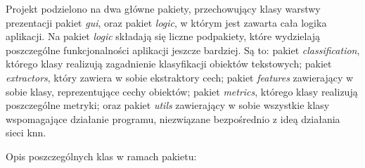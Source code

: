 \documentclass{classrep}
\begin{document}
Projekt podzielono na dwa główne pakiety, przechowujący klasy warstwy prezentacji pakiet \textit{gui}, oraz pakiet \textit{logic}, w którym jest zawarta cała logika aplikacji. Na pakiet \textit{logic} składają się liczne podpakiety, które wydzielają poszczególne funkcjonalności aplikacji jeszcze bardziej. Są to: pakiet \textit{classification}, którego klasy realizują zagadnienie klasyfikacji obiektów tekstowych; pakiet \textit{extractors}, który zawiera w sobie ekstraktory cech; pakiet \textit{features} zawierający w sobie klasy, reprezentujące cechy obiektów; pakiet \textit{metrics}, którego klasy realizują poszczególne metryki; oraz pakiet \textit{utils} zawierający w sobie wszystkie klasy wspomagające działanie programu, niezwiązane bezpośrednio z ideą działania sieci knn.

Opis poszczególnych klas w ramach pakietu:
\end{document}
